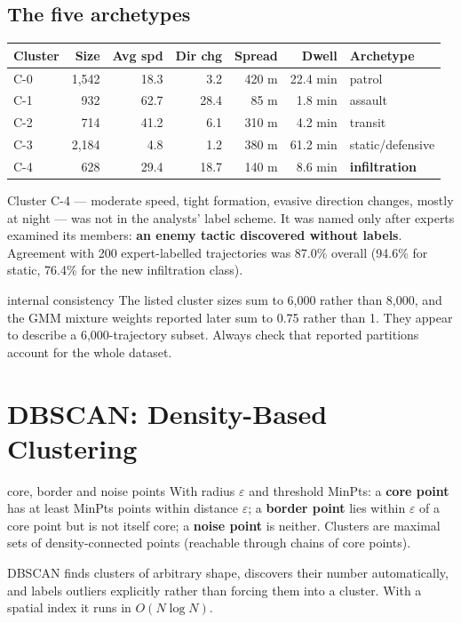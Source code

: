\documentclass[11pt]{article}
\begin{document}
\subsection{The five archetypes}
\begin{center}\small\renewcommand{\arraystretch}{1.2}
\begin{tabular}{lrrrrrl}\toprule Cluster & Size & Avg spd & Dir chg & Spread & Dwell & Archetype\\\midrule C-0 & 1,542 & 18.3 & 3.2 & 420 m & 22.4 min & patrol\\ C-1 & 932 & 62.7 & 28.4 & 85 m & 1.8 min & assault\\ C-2 & 714 & 41.2 & 6.1 & 310 m & 4.2 min & transit\\ C-3 & 2,184 & 4.8 & 1.2 & 380 m & 61.2 min & static/defensive\\ C-4 & 628 & 29.4 & 18.7 & 140 m & 8.6 min & \textbf{infiltration}\\\bottomrule\end{tabular}\end{center}
Cluster C-4 --- moderate speed, tight formation, evasive direction changes, mostly at night --- was not in the analysts' label scheme. It was named only after experts examined its members: \textbf{an enemy tactic discovered without labels}. Agreement with 200 expert-labelled trajectories was 87.0\% overall (94.6\% for static, 76.4\% for the new infiltration class).
\begin{pitfall}{internal consistency}
The listed cluster sizes sum to 6,000 rather than 8,000, and the GMM mixture weights reported later sum to 0.75 rather than 1. They appear to describe a 6,000-trajectory subset. Always check that reported partitions account for the whole dataset.
\end{pitfall}

\section{DBSCAN: Density-Based Clustering}
\begin{definition}{core, border and noise points}
With radius $\varepsilon$ and threshold MinPts: a \textbf{core point} has at least MinPts points within distance $\varepsilon$; a \textbf{border point} lies within $\varepsilon$ of a core point but is not itself core; a \textbf{noise point} is neither. Clusters are maximal sets of density-connected points (reachable through chains of core points).
\end{definition}
DBSCAN finds clusters of arbitrary shape, discovers their number automatically, and labels outliers explicitly rather than forcing them into a cluster. With a spatial index it runs in $O(N\log N)$.
\end{document}
